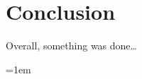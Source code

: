\documentclass[12pt]{report}
\begin{document}








\chapter*{Conclusion}

Overall, something was done\dots


        

\emergencystretch=1em

\printbibliography
{}


% 
% 
\end{document}
